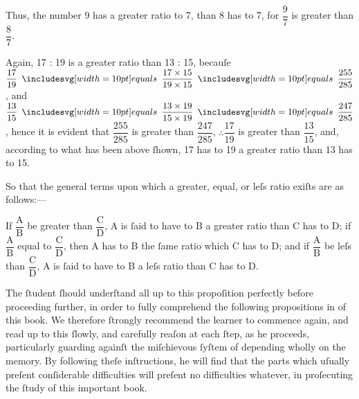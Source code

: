 \documentclass[11pt,preview]{standalone}
\begin{document}
\hfill

Thus, the number 9 has a greater ratio to 7, than 8 has to 7, for $\dfrac{\text{9}}{\text{7}}$ is greater than $\dfrac{\text{8}}{\text{7}}$.\\

\hfill

Again, 17 : 19 is a greater ratio than 13 : 15, becauſe $\dfrac{\text{17}}{\text{19}} \bequals \dfrac{\text{17} \times \text{15}}{\text{19} \times \text{15}} \bequals \dfrac{\text{255}}{\text{285}}$, and $\dfrac{\text{13}}{\text{15}} \bequals \dfrac{\text{13} \times \text{19}}{\text{15} \times \text{19}} \bequals \dfrac{\text{247}}{\text{285}}$, hence it is evident that $\dfrac{\text{255}}{\text{285}}$ is greater than $\dfrac{\text{247}}{\text{285}}$, $\therefore \dfrac{\text{17}}{\text{19}}$ is greater than $\dfrac{\text{13}}{\text{15}}$, and, according to what has been above ſhown, 17 has to 19 a greater ratio than 13 has to 15.\\

\hfill

So that the general terms upon which a greater, equal, or leſs ratio exiſts are as follows:---\\

\hfill

If $\dfrac{\text{A}}{\text{B}}$ be greater than $\dfrac{\text{C}}{\text{D}}$, A is ſaid to have to B a greater ratio than C has to D; if $\dfrac{\text{A}}{\text{B}}$ equal to $\dfrac{\text{C}}{\text{D}}$, then A has to B the ſame ratio which C has to D; and if $\dfrac{\text{A}}{\text{B}}$ be leſs than $\dfrac{\text{C}}{\text{D}}$, A is ſaid to have to B a leſs ratio than C has to D.\\

\hfill

The ſtudent ſhould underſtand all up to this propoſition perfectly before proceeding further, in order to fully comprehend the following propositions in of this book. We therefore ſtrongly recommend the learner to commence again, and read up to this ſlowly, and carefully reaſon at each ſtep, as he proceeds, particularly guarding againſt the miſchievous ſyſtem of depending wholly on the memory. By following theſe inſtructions, he will find that the parts which uſually preſent conſiderable difficulties will preſent no difficulties whatever, in proſecuting the ſtudy of this important book.
\end{document}
